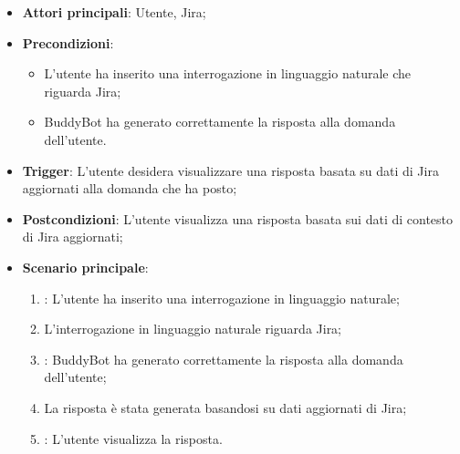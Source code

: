 \begin{itemize}
    \item \textbf{Attori principali}: Utente, Jira;
    \item \textbf{Precondizioni}: 
    \begin{itemize}
        \item L'utente ha inserito una interrogazione in linguaggio naturale che riguarda Jira;
        \item BuddyBot ha generato correttamente la risposta alla domanda dell'utente.
    \end{itemize}
    \item \textbf{Trigger}: L'utente desidera visualizzare una risposta basata su dati di Jira aggiornati alla domanda che ha posto;
    \item \textbf{Postcondizioni}: L'utente visualizza una risposta basata sui dati di contesto di Jira aggiornati;
    \item \textbf{Scenario principale}: 
    \begin{enumerate}
        \item {}: L'utente ha inserito una interrogazione in linguaggio naturale;
        \item L'interrogazione in linguaggio naturale riguarda Jira;
        \item {}: BuddyBot ha generato correttamente la risposta alla domanda dell'utente;
        \item La risposta è stata generata basandosi su dati aggiornati di Jira;
        \item {}: L'utente visualizza la risposta.
    \end{enumerate}
\end{itemize}



\hypertarget{UC11.3}{}

